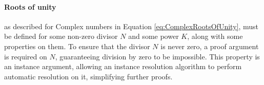 \begin{AgdaMultiCode}
\paragraph{Roots of unity}\label{para:roots_of_unity} as described for Complex numbers in Equation 
\ref{eq:ComplexRootsOfUnity}, must be defined for some non-zero divisor $N$ 
and some power $K$, along with some properties on them.
To ensure that the divisor $N$ is never zero, a  proof argument is 
required on $N$, guaranteeing division by zero to be impossible.
This  property is an instance argument, allowing an instance 
resolution algorithm\cite{InstanceArgs}
to perform automatic resolution on it, simplifying further proofs.
\begin{code}%
%
\>[6]\<%
\\
%
\>[6]\AgdaSpace{}%
\AgdaSymbol{:}\AgdaSpace{}%
\AgdaSymbol{(}\AgdaSpace{}%
\AgdaSymbol{:}\AgdaSpace{}%
\AgdaSymbol{)}\AgdaSpace{}%
\AgdaSpace{}%
\AgdaSpace{}%
\AgdaSpace{}%
\AgdaSymbol{:}\AgdaSpace{}%
\AgdaSpace{}%
\AgdaSpace{}%
\AgdaSymbol{\}\}}\AgdaSpace{}%
\AgdaSpace{}%
\AgdaSymbol{(}\AgdaSpace{}%
\AgdaSymbol{:}\AgdaSpace{}%
\AgdaSymbol{)}\AgdaSpace{}%
\AgdaSpace{}%
\<%
\\
%
\>[6]%
\>[17]\AgdaSymbol{:}\AgdaSpace{}%
\AgdaSpace{}%
\AgdaSpace{}%
%
\>[43]\AgdaSpace{}%
\<%
\\
%
\>[6]%
\>[17]\AgdaSymbol{:}\AgdaSpace{}%
\AgdaSpace{}%
\AgdaSpace{}%
\AgdaSymbol{(}\AgdaSpace{}%
\AgdaSpace{}%
\AgdaSymbol{)}%
\>[43]\AgdaSpace{}%
\<%
\\
%
\>[6]%
\>[17]\AgdaSymbol{:}\AgdaSpace{}%
\AgdaSpace{}%
\AgdaSymbol{(}\AgdaSpace{}%
\AgdaSpace{}%
\AgdaSymbol{)}\AgdaSpace{}%
\AgdaSymbol{(}\AgdaSpace{}%
\AgdaSpace{}%
\AgdaSymbol{)}%
\>[43]\AgdaSpace{}%
\AgdaSpace{}%
\AgdaSpace{}%
\<%

\end{code}
\end{AgdaMultiCode}
